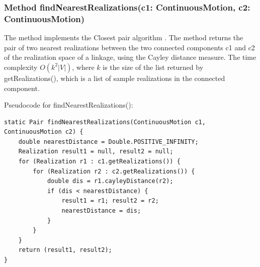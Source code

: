 \documentclass[10pt]{article}
\begin{document}
\subsubsection{Method \textsf{findNearestRealizations(c1: ContinuousMotion, 
 c2: ContinuousMotion)}}\label{sec:findnearest}
 The method implements the Closest pair algorithm \cite[Theorem 5(ii)]{sitharam2014beast}.
The method returns the pair of two nearest realizations between the two connected components 
\textsf{c1} and \textsf{c2} of the realization space of a linkage, 
using the Cayley distance measure. 
%
The time complexity $O(k^2|V|)$, 
where $k$ is the size of the list returned by \textsf{getRealizations()},
which is a  list of sample realizations in the connected component.

\smallskip
Pseudocode for \textsf{findNearestRealizations()}:

\begin{lstlisting}
static Pair findNearestRealizations(ContinuousMotion c1, ContinuousMotion c2) {
	double nearestDistance = Double.POSITIVE_INFINITY;
	Realization result1 = null, result2 = null;
	for (Realization r1 : c1.getRealizations()) {
		for (Realization r2 : c2.getRealizations()) {
			double dis = r1.cayleyDistance(r2);
			if (dis < nearestDistance) {
				result1 = r1; result2 = r2;
				nearestDistance = dis;
			}
		}
	}
	return (result1, result2);
}
\end{lstlisting}






\end{document}
